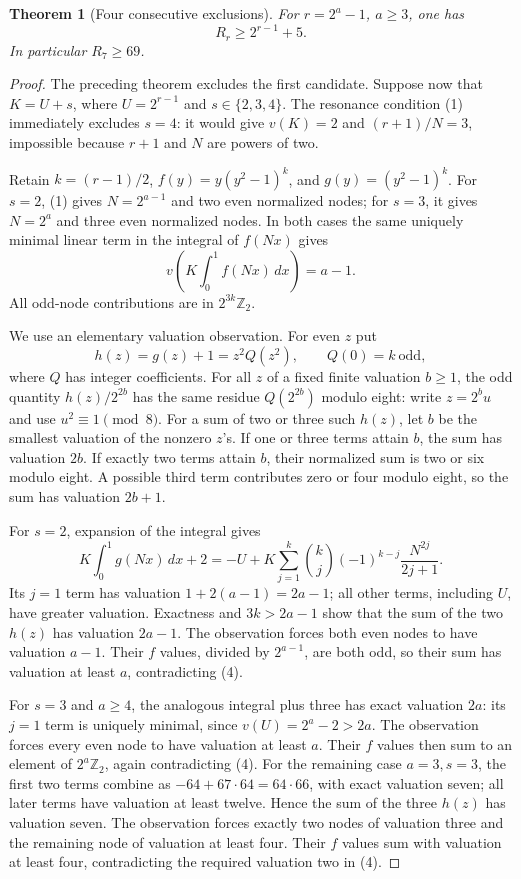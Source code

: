 \documentclass[11pt]{article}
\newtheorem{theorem}{Theorem}
\begin{document}
\begin{theorem}[Four consecutive exclusions]
For $r=2^a-1$, $a\ge3$, one has
\[
 R_r\ge2^{r-1}+5.
\]
In particular $R_7\ge69$.
\end{theorem}
\begin{proof}
The preceding theorem excludes the first candidate. Suppose now that
$K=U+s$, where $U=2^{r-1}$ and $s\in\{2,3,4\}$.
The resonance condition (1) immediately excludes $s=4$: it would give
$v(K)=2$ and $(r+1)/N=3$, impossible because $r+1$ and $N$ are powers
of two.

Retain $k=(r-1)/2$, $f(y)=y(y^2-1)^k$, and $g(y)=(y^2-1)^k$.
For $s=2$, (1) gives $N=2^{a-1}$ and two even normalized nodes; for
$s=3$, it gives $N=2^a$ and three even normalized nodes.
In both cases the same uniquely minimal linear term in the integral
of $f(Nx)$ gives
\[
 v\left(K\int_0^1f(Nx)\,dx\right)=a-1.\tag{4}
\]
All odd-node contributions are in $2^{3k}\mathbb Z_2$.

We use an elementary valuation observation. For even $z$ put
\[
 h(z)=g(z)+1=z^2Q(z^2),\qquad Q(0)=k\ \text{odd},
\]
where $Q$ has integer coefficients. For all $z$ of a fixed finite
valuation $b\ge1$, the odd quantity $h(z)/2^{2b}$ has the same residue
$Q(2^{2b})$ modulo eight: write $z=2^bu$ and use $u^2\equiv1\pmod8$.
For a sum of two or three such $h(z)$, let $b$ be the smallest valuation
of the nonzero $z$'s. If one or three terms attain $b$, the sum has
valuation $2b$. If exactly two terms attain $b$, their normalized sum
is two or six modulo eight. A possible third term contributes zero or
four modulo eight, so the sum has valuation $2b+1$.

For $s=2$, expansion of the integral gives
\[
 K\int_0^1g(Nx)\,dx+2
 =-U+K\sum_{j=1}^k {k\choose j}(-1)^{k-j}
                 \frac{N^{2j}}{2j+1}.
\]
Its $j=1$ term has valuation $1+2(a-1)=2a-1$; all other terms,
including $U$, have greater valuation. Exactness and $3k>2a-1$ show
that the sum of the two $h(z)$ has valuation $2a-1$.
The observation forces both even nodes to have valuation $a-1$.
Their $f$ values, divided by $2^{a-1}$, are both odd, so their sum
has valuation at least $a$, contradicting (4).

For $s=3$ and $a\ge4$, the analogous integral plus three has exact
valuation $2a$: its $j=1$ term is uniquely minimal, since
$v(U)=2^a-2>2a$. The observation forces every even node to have
valuation at least $a$. Their $f$ values then sum to an element of
$2^a\mathbb Z_2$, again contradicting (4).
For the remaining case $a=3,s=3$, the first two terms combine as
$-64+67\cdot64=64\cdot66$, with exact valuation seven; all later
terms have valuation at least twelve. Hence the sum of the three
$h(z)$ has valuation seven. The observation forces exactly two nodes
of valuation three and the remaining node of valuation at least four.
Their $f$ values sum with valuation at least four, contradicting the
required valuation two in (4).
\end{proof}
\end{document}
